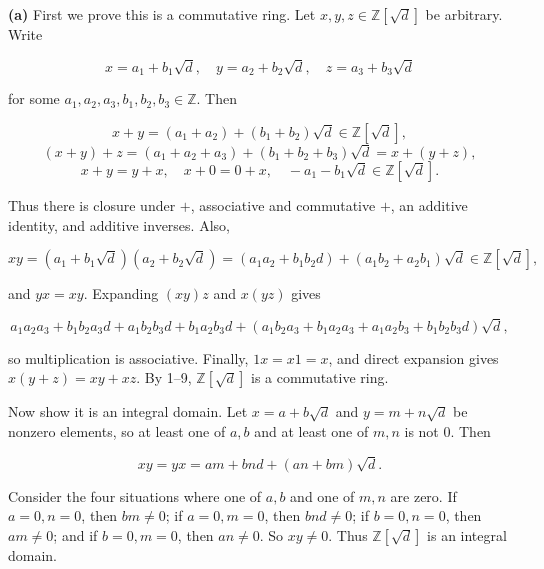 \textbf{(a)} First we prove this is a commutative ring. Let \(x,y,z \in \mathbb{Z}\left\lbrack \sqrt{d} \right\rbrack\) be arbitrary. Write

\[x = a_{1} + b_{1}\sqrt{d},\quad y = a_{2} + b_{2}\sqrt{d},\quad z = a_{3} + b_{3}\sqrt{d}\]

for some \(a_{1},a_{2},a_{3},b_{1},b_{2},b_{3} \in \mathbb{Z}\). Then

\[x + y = \left( {a_{1} + a_{2}} \right) + \left( {b_{1} + b_{2}} \right)\sqrt{d} \in \mathbb{Z}\left\lbrack \sqrt{d} \right\rbrack,\]\[\left( {x + y} \right) + z = \left( {a_{1} + a_{2} + a_{3}} \right) + \left( {b_{1} + b_{2} + b_{3}} \right)\sqrt{d} = x + \left( {y + z} \right),\]\[x + y = y + x,\quad x + 0 = 0 + x,\quad - a_{1} - b_{1}\sqrt{d} \in \mathbb{Z}\left\lbrack \sqrt{d} \right\rbrack.\]

Thus there is closure under \(+\), associative and commutative \(+\), an additive identity, and additive inverses. Also,

\[xy = \left( {a_{1} + b_{1}\sqrt{d}} \right)\left( {a_{2} + b_{2}\sqrt{d}} \right) = \left( {a_{1}a_{2} + b_{1}b_{2}d} \right) + \left( {a_{1}b_{2} + a_{2}b_{1}} \right)\sqrt{d} \in \mathbb{Z}\left\lbrack \sqrt{d} \right\rbrack,\]

and \(yx = xy\). Expanding \(\left( {xy} \right)z\) and \(x\left( {yz} \right)\) gives

\[a_{1}a_{2}a_{3} + b_{1}b_{2}a_{3}d + a_{1}b_{2}b_{3}d + b_{1}a_{2}b_{3}d + \left( {a_{1}b_{2}a_{3} + b_{1}a_{2}a_{3} + a_{1}a_{2}b_{3} + b_{1}b_{2}b_{3}d} \right)\sqrt{d},\]

so multiplication is associative. Finally, \(1x = x1 = x\), and direct expansion gives \(x\left( {y + z} \right) = xy + xz\). By 1--9, \(\mathbb{Z}\left\lbrack \sqrt{d} \right\rbrack\) is a commutative ring.

Now show it is an integral domain. Let \(x = a + b\sqrt{d}\) and \(y = m + n\sqrt{d}\) be nonzero elements, so at least one of \(a,b\) and at least one of \(m,n\) is not \(0\). Then

\[xy = yx = am + bnd + \left( {an + bm} \right)\sqrt{d}.\]

Consider the four situations where one of \(a,b\) and one of \(m,n\) are zero. If \(a = 0,n = 0\), then \(bm \neq 0\); if \(a = 0,m = 0\), then \(bnd \neq 0\); if \(b = 0,n = 0\), then \(am \neq 0\); and if \(b = 0,m = 0\), then \(an \neq 0\). So \(xy \neq 0\). Thus \(\mathbb{Z}\left\lbrack \sqrt{d} \right\rbrack\) is an integral domain.

